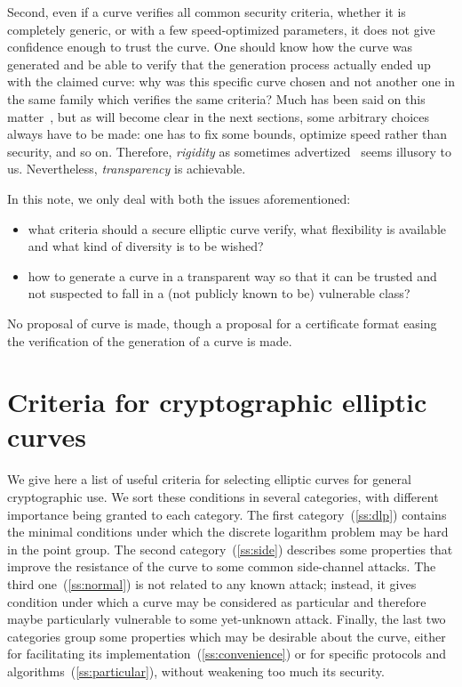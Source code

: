 \documentclass[twocolumn,letterpaper]{article}
\begin{document}
Second, even if a curve verifies all common security criteria,
whether it is completely generic, or with a few speed-optimized parameters,
it does not give confidence enough to trust the curve.
One should know how the curve was generated and be able to verify that the
generation process actually ended up with the claimed curve:
why was this specific curve chosen and not another one in the same family
which verifies the same criteria?
Much has been said on this matter~\cite{safecurves,msr2014bcln,eprint2014brainpool,eprint2013abgr},
but as will become clear in the next sections, some arbitrary choices always have
to be made: one has to fix some bounds, optimize speed rather than security, and so on.
Therefore, \emph{rigidity} as sometimes advertized~\cite{safecurves} seems illusory
to us.
Nevertheless, \emph{transparency} is achievable.

In this note, we only deal with both the issues aforementioned:
\begin{itemize}
\item what criteria should a secure elliptic curve verify, what flexibility is available and what kind of diversity is to be wished?
\item how to generate a curve in a transparent way so that it can be trusted and
not suspected to fall in a (not publicly known to be) vulnerable class?
\end{itemize}
No proposal of curve is made, though a proposal for a certificate format
easing the verification of the generation of a curve is made.

\section{Criteria for cryptographic elliptic curves}
\label{s:criteria}

We give here a list of useful criteria for selecting elliptic curves
for general cryptographic use.
We sort these conditions in several categories,
with different importance being granted to each category.
The first category~(\ref{ss:dlp}) contains the minimal conditions under which
the discrete logarithm problem may be hard in the point group.
The second category~(\ref{ss:side}) describes some properties that improve
the resistance of the curve to some common side-channel attacks.
The third one~(\ref{ss:normal}) is not related to any known attack;
instead, it gives condition under which a curve may be considered
as particular and therefore maybe particularly vulnerable
to some yet-unknown attack.
Finally, the last two categories group some properties
which may be desirable about the curve,
either for facilitating its implementation~(\ref{ss:convenience})
or for specific protocols and algorithms~(\ref{ss:particular}),
without weakening too much its security.
\end{document}
